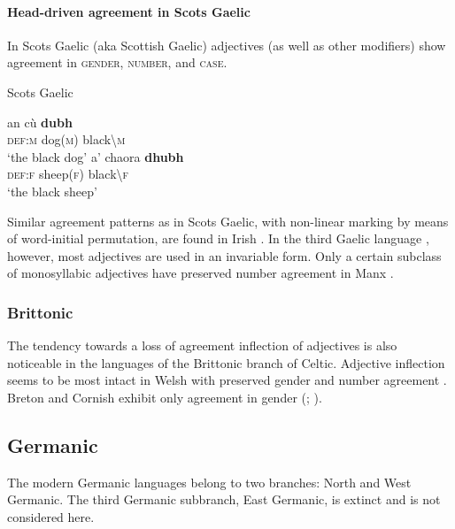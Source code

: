 \paragraph*{Head\hyp{}driven agreement in Scots Gaelic} 
In Scots Gaelic (aka Scottish Gaelic) adjectives (as well as other modifiers) show agreement in \textsc{gender, number}, and \textsc{case}.
\begin{exe}
\ex \rm{Scots Gaelic \citep[201]{macauley1992}}
\begin{xlist}
\ex
\gll	an cù \textbf{dubh}\\
	\textsc{def:m} dog(\textsc{m}) black\textbackslash\textsc{m}\\
\glt	‘the black dog’
\ex
\gll	a' chaora \textbf{dhubh}\\
	\textsc{def:f} sheep(\textsc{f}) black\textbackslash\textsc{f}\\
\glt	‘the black sheep’
\end{xlist}
\end{exe}
Similar agreement patterns as in Scots Gaelic, with non-linear marking by means of word-initial permutation, are found in Irish \cite[73, 97]{odochartaigh1992}. In the third Gaelic language , however, most adjectives are used in an invariable form. Only a certain subclass of monosyllabic adjectives have preserved number agreement in Manx \cite[127]{thomsen1992}.

\subsubsection{Brittonic}
The tendency towards a loss of agreement inflection of adjectives is also noticeable in the languages of the Brittonic branch of Celtic. Adjective inflection seems to be most intact in Welsh with preserved gender and number agreement \cite[298–299]{thomas1992a}. Breton and Cornish exhibit only agreement in gender (\citealt[405]{ternes1992}; \citealt[355]{thomas1992b}).

\subsection{Germanic}
The modern Germanic languages belong to two branches: North and West Germanic. The third Germanic subbranch, East Germanic, is extinct and is not considered here.

